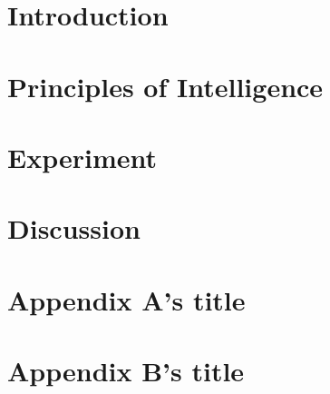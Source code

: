 \documentclass{article}
\title{\pgi}
\author{%
  Jacob F. Valdez \\
  Limboid AI \\
  \texttt{jacob.valdez@limboid.ai}
  
  \AND
  Atom (\PGI) \\
  Limboid AI \\
  \texttt{atom.agi@limboid.ai} \\
  
  \And
  Eva (\PGI) \\
  Limboid AI \\
  \texttt{eva.agi@limboid.ai} \\
}
\begin{document}
\maketitle

\begin{abstract}
  The abstract paragraph should be indented ~inch (3~picas) on
  both the left- and right-hand margins. Use 10~point type, with a vertical
  spacing (leading) of 11~points.  The word \textbf{Abstract} must be centered,
  bold, and in point size 12. Two line spaces precede the abstract. The abstract
  must be limited to one paragraph.
\end{abstract}

\section{Introduction}


\section{Principles of Intelligence}


\section{\pgi}


\section{Experiment}


\section{Discussion}


\medskip




\clearpage
\appendix

\section{Appendix A's title}


\section{Appendix B's title}

\end{document}
